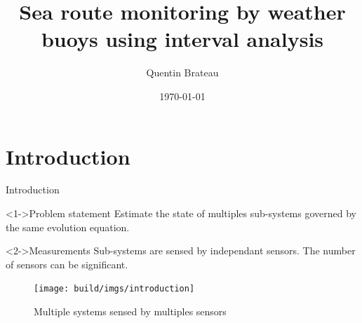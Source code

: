 \documentclass{beamer}
\title{Sea route monitoring by weather buoys using interval analysis}
\date{\today}
\author{Quentin Brateau}
\institute{ENSTA Bretagne}
\begin{document}
    \maketitle

    \section{Introduction}

        \begin{frame}{Introduction}
            \begin{minipage}{0.55\textwidth}
                \begin{block}<1->{Problem statement}
                    Estimate the state of multiples sub-systems governed by the same evolution equation.
                \end{block}
                \begin{block}<2->{Measurements}
                    Sub-systems are sensed by independant sensors. The number of sensors can be significant.
                \end{block}
            \end{minipage}
            \hfill
            \begin{minipage}{0.4\textwidth}
                \begin{figure}
                    \texttt{[image: build/imgs/introduction]}
                    \caption{Multiple systems sensed by multiples sensors}
                \end{figure}
            \end{minipage}
        \end{frame}
\end{document}
